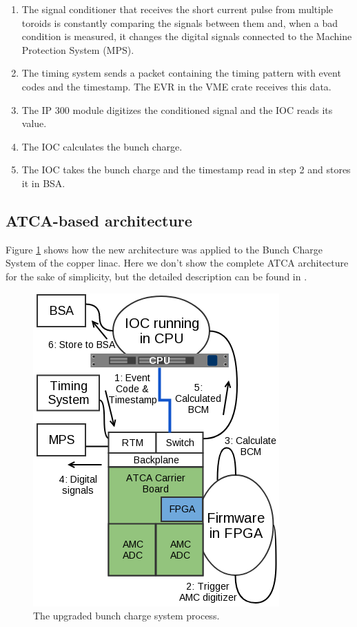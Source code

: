 \documentclass[letter,
        biblatex,   %
        keeplastbox,  %
        ]{jacow}
\begin{document}
\begin{enumerate}
  \item The signal conditioner that receives the short current pulse from multiple toroids is constantly comparing the signals between them and, when a bad condition is measured, it changes the digital signals connected to the Machine Protection System (MPS).
  \item The timing system sends a packet containing the timing pattern with event codes and the timestamp. The EVR in the VME crate receives this data.
  \item The IP 300 module digitizes the conditioned signal and the IOC reads its value.
  \item The IOC calculates the bunch charge.
  \item The IOC takes the bunch charge and the timestamp read in step 2 and stores it in BSA.
\end{enumerate}

\subsection{ATCA-based architecture}
Figure \ref{fig:bcm_atca} shows how the new architecture was applied to the Bunch Charge System of the copper linac. Here we don't show the complete ATCA architecture for the sake of simplicity, but the detailed description can be found in \cite{ryan-2016, atca-bpm-2017}.

\begin{figure}[!htb]
  \centering
  \includegraphics*[width=.8\columnwidth]{BCM_ATCA_Process}
  \caption{The upgraded bunch charge system process.}
  \label{fig:bcm_atca}
\end{figure}
\end{document}
